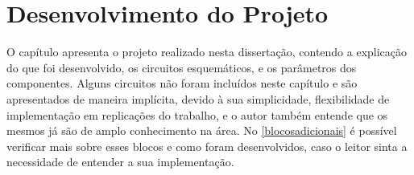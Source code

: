 \chapter[Desenvolvimento do Projeto]{Desenvolvimento do Projeto}

O capítulo apresenta o projeto realizado nesta dissertação, contendo a explicação do que foi desenvolvido, os circuitos esquemáticos, e os parâmetros dos componentes. Alguns circuitos não foram incluídos neste capítulo e são apresentados de maneira implícita, devido à sua simplicidade, flexibilidade de implementação em replicações do trabalho, e o autor também entende que os mesmos já são de amplo conhecimento na área. No \autoref{blocosadicionais} é possível verificar mais sobre esses blocos e como foram desenvolvidos, caso o leitor sinta a necessidade de entender a sua implementação.

\newcommand{\NomeBloco}{NULL}
\newcommand{\NomeBlocoNoIt}{NULL}
\newcommand{\NomeBlocoNoUnderline}{NULL}
\newcommand{\NomePTab}{tab_\NomeBlocoNoUnderline}
\newcommand{\NomeSTab}{tab_\NomeBlocoNoUnderline2}
\newcommand{\NomePFig}{fig_\NomeBlocoNoUnderline}
\newcommand{\NomeSFig}{fig_\NomeBlocoNoUnderline2}
\newcommand{\NomeTTab}{tab_\NomeBlocoNoUnderline3}
\newcommand{\NomeQTab}{tab_\NomeBlocoNoUnderline4}











